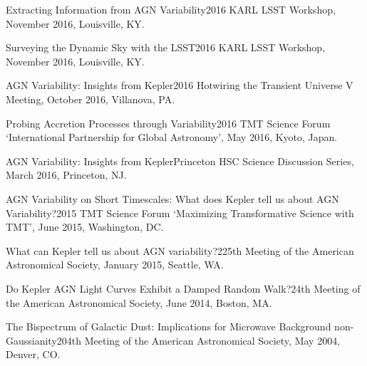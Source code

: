 \documentclass[10pt,a4paper]{article}
\begin{document}
\inlineheadsection
  {Extracting Information from AGN Variability}{2016 KARL LSST Workshop, November 2016, Louisville, KY.}

\inlineheadsection
  {Surveying the Dynamic Sky with the LSST}{2016 KARL LSST Workshop, November 2016, Louisville, KY.}

\inlineheadsection
  {AGN Variability: Insights from Kepler}{2016 Hotwiring the Transient Universe V Meeting, October 2016, Villanova, PA.}

\inlineheadsection
  {Probing Accretion Processes through Variability}{2016 TMT Science Forum `International Partnership for Global Astronomy', May 2016, Kyoto, Japan.}

\inlineheadsection
  {AGN Variability: Insights from Kepler}{Princeton HSC Science Discussion Series, March 2016, Princeton, NJ.}

\inlineheadsection
  {AGN Variability on Short Timescales: What does Kepler tell us about AGN Variability?}{2015 TMT Science Forum `Maximizing Transformative Science with TMT', June 2015, Washington, DC.}

\inlineheadsection
  {What can Kepler tell us about AGN variability?}{225th Meeting of the American Astronomical Society, January 2015, Seattle, WA.}

\inlineheadsection
  {Do Kepler AGN Light Curves Exhibit a Damped Random Walk?}{24th Meeting of the American Astronomical Society, June 2014, Boston, MA.}

\inlineheadsection
  {The Bispectrum of Galactic Dust: Implications for Microwave Background non-Gaussianity}{204th Meeting of the American Astronomical Society, May 2004, Denver, CO.}
\end{document}
